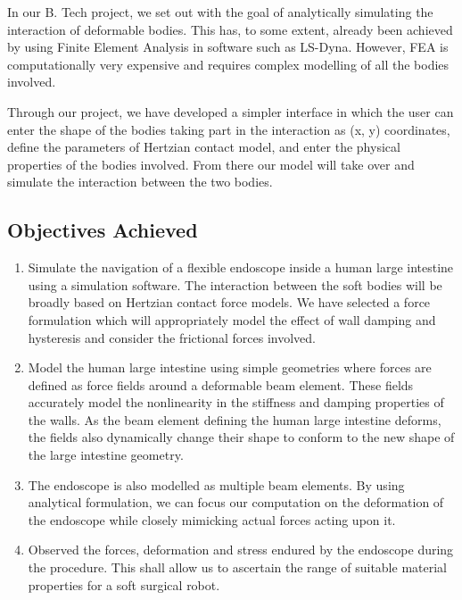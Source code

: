 \documentclass[12pt]{report}
\begin{document}
In our B. Tech project, we set out with the goal of analytically simulating the interaction of deformable bodies. This has, to some extent, already been achieved by using Finite Element Analysis in software such as LS-Dyna. However, FEA is computationally very expensive and requires complex modelling of all the bodies involved. \par

Through our project, we have developed a simpler interface in which the user can enter the shape of the bodies taking part in the interaction as (x, y) coordinates, define the parameters of Hertzian contact model, and enter the physical properties of the bodies involved. From there our model will take over and simulate the interaction between the two bodies. \par

\subsection*{Objectives Achieved}
\begin{enumerate}
	\item Simulate the navigation of a flexible endoscope inside a human large intestine using a simulation software. The interaction between the soft bodies will be broadly based on Hertzian contact force models. We have selected a force formulation which will appropriately model the effect of wall damping and hysteresis and consider the frictional forces involved. \par

	\item Model the human large intestine using simple geometries where forces are defined as force fields around a deformable beam element. These fields accurately model the nonlinearity in the stiffness and damping properties of the walls. As the beam element defining the human large intestine deforms, the fields also dynamically change their shape to conform to the new shape of the large intestine geometry.\par

	\item The endoscope is also modelled as multiple beam elements. By using analytical formulation, we can focus our computation on the deformation of the endoscope while closely mimicking actual forces acting upon it.\par

	\item Observed the forces, deformation and stress endured by the endoscope during the procedure. This shall allow us to ascertain the range of suitable material properties for a soft surgical robot.
\end{enumerate}\par
\end{document}
